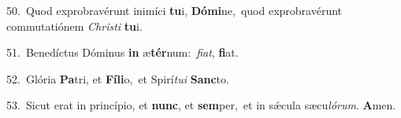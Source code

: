 {\numbfont\textcolor{\numbcolor}{50.}}~Quod exprobravérunt inimíci \textbf{tu}\-i, \textbf{Dó}\-\textbf{mi}ne,~\star quod exprobravérunt commutatiónem \textit{Chris}\-\textit{ti} \textbf{tu}\-i.\par
{\numbfont\textcolor{\numbcolor}{51.}}~Benedíctus Dóminus \textbf{in} æ\-\textbf{tér}\-num:~\star \textit{fi}\-\textit{at}, \textbf{fi}\-at.\par
{\numbfont\textcolor{\numbcolor}{52.}}~Glória \textbf{Pa}\-tri, et \textbf{Fí}\-\textbf{li}o,~\star et Spirí\-\textit{tu}\-\textit{i} \textbf{Sanc}\-to.\par
{\numbfont\textcolor{\numbcolor}{53.}}~Sicut erat in princípio, et \textbf{nunc}\-, et \textbf{sem}\-per,~\star et in sǽcula sæcu\-\textit{ló}\-\textit{rum}. \textbf{A}\-men.\par
